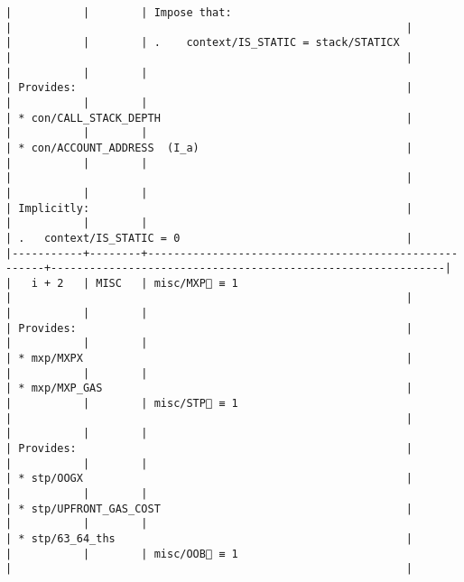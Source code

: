 \documentclass[varwidth=\maxdimen,margin=0.5cm,multi={verbatim}]{standalone}
\begin{document}
\begin{verbatim}
|           |        | Impose that:                                         |                                                             |
|           |        | .    context/IS_STATIC = stack/STATICX               |                                                             |
|           |        |                                                      | Provides:                                                   |
|           |        |                                                      | * con/CALL_STACK_DEPTH                                      |
|           |        |                                                      | * con/ACCOUNT_ADDRESS  (I_a)                                |
|           |        |                                                      |                                                             |
|           |        |                                                      | Implicitly:                                                 |
|           |        |                                                      | .   context/IS_STATIC = 0                                   |
|-----------+--------+------------------------------------------------------+-------------------------------------------------------------|
|   i + 2   | MISC   | misc/MXP🚩 ≡ 1                                       |                                                             |
|           |        |                                                      | Provides:                                                   |
|           |        |                                                      | * mxp/MXPX                                                  |
|           |        |                                                      | * mxp/MXP_GAS                                               |
|           |        | misc/STP🚩 ≡ 1                                       |                                                             |
|           |        |                                                      | Provides:                                                   |
|           |        |                                                      | * stp/OOGX                                                  |
|           |        |                                                      | * stp/UPFRONT_GAS_COST                                      |
|           |        |                                                      | * stp/63_64_ths                                             |
|           |        | misc/OOB🚩 ≡ 1                                       |                                                             |

\end{verbatim}
\end{document}
